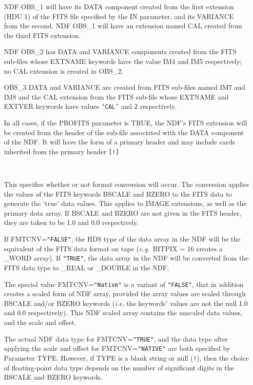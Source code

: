\documentclass[twoside,11pt]{article}
\newcommand{\sstsubsection}[1]{ \item[{#1}] \mbox{} \\}
\newcommand{\sstsubsection}[1]{\item[{#1}]}
\begin{document}
{{{        NDF OBS\_1 will have its DATA component created from the first
        extension  (HDU 1) of the FITS file specified by the IN parameter,
        and its VARIANCE from the second.  NDF OBS\_1 will have an extension
        named CAL created from the third FITS extension.

        NDF OBS\_2 has DATA and VARIANCE components created from the FITS
        sub-files whose EXTNAME keywords have the value IM4 and IM5
        respectively; no CAL extension is created in OBS\_2.

        OBS\_3 DATA and VARIANCE are created from FITS sub-files named IM7 and
        IM8 and the CAL extension from the FITS sub-file whose EXTNAME and
        EXTVER keywords have values \texttt{`CAL'} and \texttt{2} respectively.

        In all cases, if the PROFITS parameter is TRUE, the NDF's FITS
        extension will be created from the header of the sub-file
        associated with the DATA component of the NDF. It will have the
        form of a primary header and may include cards inherited from the
        primary header \texttt{[!]}
      }   
   \sstsubsection{
         FMTCNV = LITERAL (Read)
      }{
         This specifies whether or not format conversion will occur.
         The conversion applies the values of the FITS keywords BSCALE
         and BZERO to the FITS data to generate the `true' data values.
         This applies to IMAGE extensions, as well as the primary data
         array.  If BSCALE and BZERO are not given in the FITS header,
         they are taken to be 1.0 and 0.0 respectively.

         If FMTCNV=\texttt{"FALSE"}, the HDS type of the data array in the NDF
         will be the equivalent of the FITS data format on tape
         ({\em{e.g.}}\ BITPIX = 16 creates a \_WORD array).  If \texttt{"TRUE"},
         the data array in the NDF will be converted from the FITS data
         type to \_REAL or \_DOUBLE in the NDF.

         The special value FMTCNV=\texttt{"Native"} is a variant of \texttt{"FALSE"}, 
         that in addition creates a scaled form of NDF array, provided
         the array values are scaled through BSCALE and/or BZERO 
         keywords (\emph{i.e.} the keywords' values are not the null 1.0 
         and 0.0 respectively).  This NDF scaled array contains the 
         unscaled data values, and the scale and offset.

         The actual NDF data type for FMTCNV=\texttt{"TRUE"}, and the data 
         type after applying the scale and offset for FMTCNV=\texttt{"NATIVE"}
         are both specified by Parameter TYPE.  However, if TYPE is a
         blank string or null ({\tt{!}}), then the choice of floating-point
         data type depends on the number of significant digits
         in the BSCALE and BZERO keywords.

}}}
\end{document}

